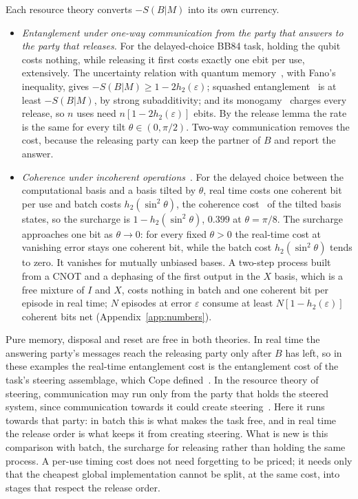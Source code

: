 \documentclass[11pt]{article}
\theoremstyle{definition}
\theoremstyle{remark}
\begin{document}
Each resource theory converts $-S(B|M)$ into its own currency.
\begin{itemize}[leftmargin=*]
\item \emph{Entanglement under one-way communication from the party that answers to the party that releases.} For the delayed-choice BB84 task, holding the qubit costs nothing, while releasing it first costs exactly one ebit per use, extensively. The uncertainty relation with quantum memory~\cite{BCCRR10}, with Fano's inequality, gives $-S(B|M)\ge1-2h_2(\varepsilon)$; squashed entanglement~\cite{ChristandlWinter04} is at least $-S(B|M)$, by strong subadditivity; and its monogamy~\cite[Thm.~8]{KoashiWinter04} charges every release, so $n$ uses need $n[1-2h_2(\varepsilon)]$ ebits. By the release lemma the rate is the same for every tilt $\theta\in(0,\pi/2)$. Two-way communication removes the cost, because the releasing party can keep the partner of $B$ and report the answer.
\item \emph{Coherence under incoherent operations}~\cite{BCP14,WinterYang16}. For the delayed choice between the computational basis and a basis tilted by $\theta$, real time costs one coherent bit per use and batch costs $h_2(\sin^2\theta)$, the coherence cost~\cite{WinterYang16} of the tilted basis states, so the surcharge is $1-h_2(\sin^2\theta)$, $0.399$ at $\theta=\pi/8$. The surcharge approaches one bit as $\theta\to0$: for every fixed $\theta>0$ the real-time cost at vanishing error stays one coherent bit, while the batch cost $h_2(\sin^2\theta)$ tends to zero. It vanishes for mutually unbiased bases. A two-step process built from a CNOT and a dephasing of the first output in the $X$ basis, which is a free mixture of $I$ and $X$, costs nothing in batch and one coherent bit per episode in real time; $N$ episodes at error $\varepsilon$ consume at least $N[1-h_2(\varepsilon)]$ coherent bits net (Appendix~\ref{app:numbers}).
\end{itemize}
Pure memory, disposal and reset are free in both theories. In real time the answering party's messages reach the releasing party only after $B$ has left, so in these examples the real-time entanglement cost is the entanglement cost of the task's steering assemblage, which Cope defined~\cite{Cope21}. In the resource theory of steering, communication may run only from the party that holds the steered system, since communication towards it could create steering~\cite{GallegoAolita15}. Here it runs towards that party: in batch this is what makes the task free, and in real time the release order is what keeps it from creating steering. What is new is this comparison with batch, the surcharge for releasing rather than holding the same process. A per-use timing cost does not need forgetting to be priced; it needs only that the cheapest global implementation cannot be split, at the same cost, into stages that respect the release order.
\end{document}

